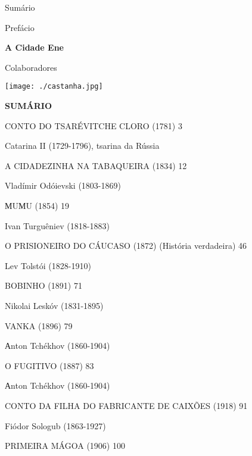 \thispagestyle{empty}
\MyriadPro
Sumário

\hspace{2cm}{\footnotesize\Georgia{\pageref{prefacio}}} \hspace{.4cm} {\footnotesize{Prefácio}} 

\medskip

\hspace{2cm}{\footnotesize\Georgia{\pageref{cidade}}} \hspace{.27cm} {\footnotesize\textbf{A Cidade Ene}} 

\medskip

\hspace{2cm}{\footnotesize\Georgia{\pageref{colaboradores}}} \hspace{.07cm} {\footnotesize{Colaboradores}}

\begin{flushright}
\vfill
\texttt{[image: ./castanha.jpg]}
\end{flushright}

\pagebreak
\thispagestyle{empty}



\textbf{SUMÁRIO}

CONTO DO TSARÉVITCHE CLORO (1781) 3

Catarina II (1729-1796), tsarina da Rússia

A CIDADEZINHA NA TABAQUEIRA (1834) 12

Vladímir Odóievski (1803-1869)

МUМU (1854) 19

Ivan Turguêniev (1818-1883)

O PRISIONEIRO DO CÁUCASO (1872) (História verdadeira) 46

Lev Tolstói (1828-1910)

BOBINHO (1891) 71

Nikolai Leskóv (1831-1895)

VANKA (1896) 79

Аnton Tchékhov (1860-1904)

O FUGITIVO (1887) 83

Аnton Tchékhov (1860-1904)

CONTO DA FILHA DO FABRICANTE DE CAIXÕES (1918) 91

Fiódor Sologub (1863-1927)

PRIMEIRA MÁGOA (1906) 100


